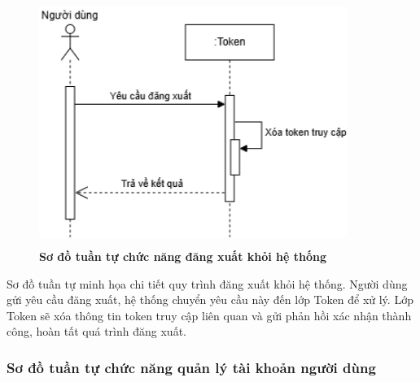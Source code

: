 \begin{figure}[H]
	\centering
	\includegraphics[width=10cm,height=8cm]{Images/sequence/user/logout.drawio.png}
	\caption[Sơ đồ tuần tự chức năng đăng xuất khỏi hệ thống]{\bfseries \fontsize{12pt}{0pt}
		\selectfont Sơ đồ tuần tự chức năng đăng xuất khỏi hệ thống}
	\label{sequence_logout} %
\end{figure}
Sơ đồ tuần tự minh họa chi tiết quy trình đăng xuất khỏi hệ thống. Người dùng gửi yêu cầu đăng xuất, hệ thống chuyển yêu cầu này đến lớp Token để xử lý.
Lớp Token sẽ xóa thông tin token truy cập liên quan và gửi phản hồi xác nhận thành công, hoàn tất quá trình đăng xuất.

\subsubsection{Sơ đồ tuần tự chức năng quản lý tài khoản người dùng}

